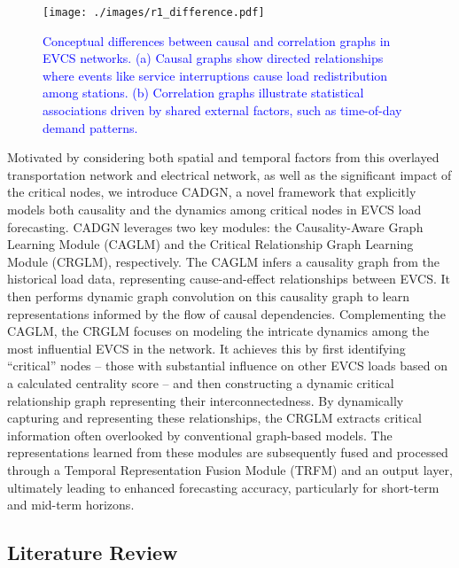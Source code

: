\documentclass[lettersize,journal]{IEEEtran}
\newcommand{\hl}[1]{\textcolor{blue}{#1}}
\begin{document}
\begin{figure}[t!]
	\centering
	\texttt{[image: ./images/r1\_difference.pdf]}
	\caption{\hl{Conceptual differences between causal and correlation graphs in EVCS networks. (a) Causal graphs show directed relationships where events like service interruptions cause load redistribution among stations. (b) Correlation graphs illustrate statistical associations driven by shared external factors, such as time-of-day demand patterns.}}
	\label{fig:difference}
    \vspace{-18pt}
\end{figure}

Motivated by considering both spatial and temporal factors from this overlayed transportation network and electrical network, as well as the significant impact of the critical nodes, we introduce CADGN, a novel framework that explicitly models both causality and the dynamics among critical nodes in EVCS load forecasting.  CADGN leverages two key modules: the Causality-Aware Graph Learning Module (CAGLM) and the Critical Relationship Graph Learning Module (CRGLM), respectively. The CAGLM infers a causality graph from the historical load data, representing cause-and-effect relationships between EVCS.  It then performs dynamic graph convolution on this causality graph to learn representations informed by the flow of causal dependencies.  Complementing the CAGLM, the CRGLM focuses on modeling the intricate dynamics among the most influential EVCS in the network. It achieves this by first identifying ``critical'' nodes – those with substantial influence on other EVCS loads based on a calculated centrality score – and then constructing a dynamic critical relationship graph representing their interconnectedness. By dynamically capturing and representing these relationships, the CRGLM extracts critical information often overlooked by conventional graph-based models. The representations learned from these modules are subsequently fused and processed through a Temporal Representation Fusion Module (TRFM) and an output layer, ultimately leading to enhanced forecasting accuracy, particularly for short-term and mid-term horizons. 

\subsection{Literature Review}
\label{sec:related_work}
\end{document}
